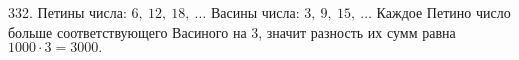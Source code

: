 332. Петины числа: $6,\ 12,\ 18,\ \ldots$ Васины числа: $3,\ 9,\ 15,\ \ldots$ Каждое Петино число больше соответствующего Васиного на 3, значит разность их сумм равна $1000\cdot3=3000.$\\
